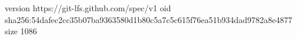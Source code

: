 version https://git-lfs.github.com/spec/v1
oid sha256:54dafec2cc35b07ba9363580d1b80c5a7c5c615f76ea51b934dad9782a8e4877
size 1086
